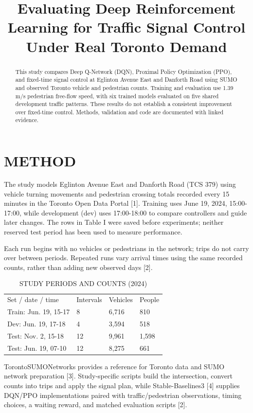 \documentclass[conference]{IEEEtran}
\begin{document}
\title{Evaluating Deep Reinforcement Learning for Traffic Signal Control Under Real Toronto Demand}
\author{}
\maketitle
\begin{abstract}This study compares Deep Q-Network (DQN), Proximal Policy Optimization (PPO), and fixed-time signal control at Eglinton Avenue East and Danforth Road using SUMO and observed Toronto vehicle and pedestrian counts. Training and evaluation use 1.39 m/s pedestrian free-flow speed, with six trained models evaluated on five shared development traffic patterns. These results do not establish a consistent improvement over fixed-time control. Methods, validation and code are documented with linked evidence.\end{abstract}
\section{METHOD}
The study models Eglinton Avenue East and Danforth Road (TCS 379) using vehicle turning movements and pedestrian crossing totals recorded every 15 minutes in the Toronto Open Data Portal [1]. Training uses June 19, 2024, 15:00-17:00, while development (dev) uses 17:00-18:00 to compare controllers and guide later changes. The rows in Table I were saved before experiments; neither reserved test period has been used to measure performance.

Each run begins with no vehicles or pedestrians in the network; trips do not carry over between periods. Repeated runs vary arrival times using the same recorded counts, rather than adding new observed days [2].

\begin{table}[ht]\centering\footnotesize
\caption{STUDY PERIODS AND COUNTS (2024)}
\setlength{\tabcolsep}{2pt}\begin{tabular}{p{125pt}p{32pt}p{41pt}p{38pt}}\hline
Set / date / time & Intervals & Vehicles & People \\
Train: Jun. 19, 15-17 & 8 & 6,716 & 810 \\
Dev: Jun. 19, 17-18 & 4 & 3,594 & 518 \\
Test: Nov. 2, 15-18 & 12 & 9,961 & 1,598 \\
Test: Jun. 19, 07-10 & 12 & 8,275 & 661 \\
\hline\end{tabular}\end{table}
TorontoSUMONetworks provides a reference for Toronto data and SUMO network preparation [3]. Study-specific scripts build the intersection, convert counts into trips and apply the signal plan, while Stable-Baselines3 [4] supplies DQN/PPO implementations paired with traffic/pedestrian observations, timing choices, a waiting reward, and matched evaluation scripts [2].
\end{document}
